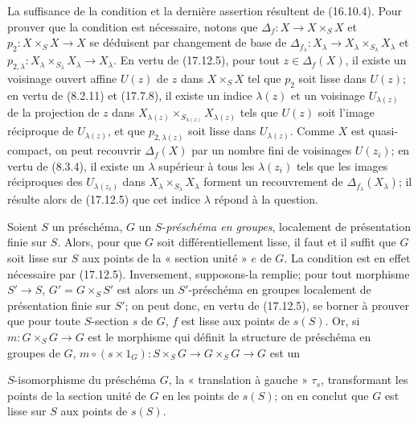 La suffisance de la condition et la dernière assertion résultent de (16.10.4). Pour prouver que la condition est nécessaire, notons que $\Delta_f:X\to X\times_SX$ et $p_2:X\times_SX\to X$ se déduisent par changement de base de $\Delta_{f_\lambda}:X_\lambda\to X_\lambda\times_{S_\lambda}X_\lambda$ et $p_{2,\lambda}:X_\lambda\times_{S_\lambda}X_\lambda\to X_\lambda$. En vertu de (17.12.5), pour tout $z\in\Delta_f(X)$, il existe un voisinage ouvert affine $U(z)$ de $z$ dans $X\times_SX$ tel que $p_2$ soit lisse dans $U(z)$; en vertu de (8.2.11) et (17.7.8), il existe un indice $\lambda(z)$ et un voisinage $U_{\lambda(z)}$ de la projection de $z$ dans $X_{\lambda(z)}\times_{S_{\lambda(z)}}X_{\lambda(z)}$ tels que $U(z)$ soit l'image réciproque de $U_{\lambda(z)}$, et que $p_{2,\lambda(z)}$ soit lisse dans $U_{\lambda(z)}$. Comme $X$ est quasi-compact, on peut recouvrir $\Delta_f(X)$ par un nombre fini de voisinages $U(z_i)$; en vertu de (8.3.4), il existe un $\lambda$ supérieur à tous les $\lambda(z_i)$ tels que les images réciproques des $U_{\lambda(z_i)}$ dans $X_\lambda\times_{S_\lambda}X_\lambda$ forment un recouvrement de $\Delta_{f_\lambda}(X_\lambda)$; il résulte alors de (17.12.5) que cet indice $\lambda$ répond à la question.

\begin{examples}[17.12.7]
\label{IV.17.12.7}
Soient $S$ un préschéma, $G$ un $S$-\emph{préschéma en groupes}, localement de présentation finie sur $S$. Alors, pour que $G$ soit différentiellement lisse, il faut et il suffit que $G$ soit lisse sur $S$ aux points de la « section unité » $e$ de $G$. La condition est en effet nécessaire par (17.12.5). Inversement, supposons-la remplie; pour tout morphisme $S'\to S$, $G'=G\times_SS'$ est alors un $S'$-préschéma en groupes localement de présentation finie sur $S'$; on peut donc, en vertu de (17.12.5), se borner à prouver que pour toute $S$-section $s$ de $G$, $f$ est lisse aux points de $s(S)$. Or, si $m:G\times_SG\to G$ est le morphisme qui définit la structure de préschéma en groupes de $G$, $m\circ(s\times1_G):S\times_SG\to G\times_SG\to G$ est un


$S$-isomorphisme du préschéma $G$, la « translation à gauche » $\tau_s$, transformant les points de la section unité de $G$ en les points de $s(S)$; on en conclut que $G$ est lisse sur $S$ aux points de $s(S)$.
\end{examples}

